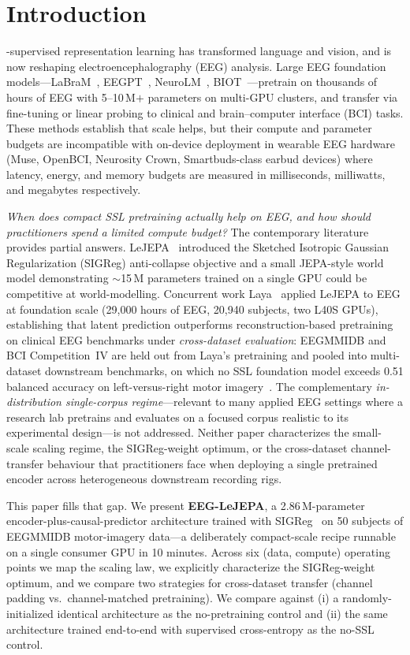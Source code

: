 \section{Introduction}
\label{sec:intro}

-supervised representation learning has transformed
language and vision, and is now reshaping electroencephalography (EEG)
analysis. Large EEG foundation models---LaBraM~\cite{labram2024},
EEGPT~\cite{eegpt2024}, NeuroLM~\cite{neurolm2025},
BIOT~\cite{biot2023}---pretrain on thousands of hours of EEG with 5--10\,M$+$
parameters on multi-GPU clusters, and transfer via fine-tuning or linear
probing to clinical and brain--computer interface (BCI) tasks. These
methods establish that scale helps, but their compute and parameter budgets
are incompatible with on-device deployment in wearable EEG hardware (Muse,
OpenBCI, Neurosity Crown, Smartbuds-class earbud devices) where latency,
energy, and memory budgets are measured in milliseconds, milliwatts, and
megabytes respectively.

\emph{When does compact SSL pretraining actually help on EEG, and how should
practitioners spend a limited compute budget?} The contemporary literature
provides partial answers. LeJEPA~\cite{lejepa2025} introduced the Sketched
Isotropic Gaussian Regularization (SIGReg) anti-collapse objective and a
small JEPA-style world model demonstrating $\sim$15\,M parameters trained on
a single GPU could be competitive at world-modelling. Concurrent work
Laya~\cite{laya2026} applied LeJEPA to EEG at foundation scale (29{,}000
hours of EEG, 20{,}940 subjects, two L40S GPUs), establishing that latent
prediction outperforms reconstruction-based pretraining on clinical EEG
benchmarks under \emph{cross-dataset evaluation}: EEGMMIDB and BCI Competition~IV
are held out from Laya's pretraining and pooled into multi-dataset downstream
benchmarks, on which no SSL foundation model exceeds 0.51 balanced accuracy
on left-versus-right motor imagery~\cite[Tab.~1]{laya2026}. The complementary
\emph{in-distribution single-corpus regime}---relevant to many applied EEG
settings where a research lab pretrains and evaluates on a focused corpus
realistic to its experimental design---is not addressed. Neither paper
characterizes the small-scale scaling regime, the SIGReg-weight optimum, or
the cross-dataset channel-transfer behaviour that practitioners face when
deploying a single pretrained encoder across heterogeneous downstream
recording rigs.

This paper fills that gap. We present \textbf{EEG-LeJEPA}, a 2.86\,M-parameter
encoder-plus-causal-predictor architecture trained with
SIGReg~\cite{lejepa2025} on 50 subjects of EEGMMIDB motor-imagery data---a
deliberately compact-scale recipe runnable on a single consumer GPU in 10
minutes. Across six (data, compute) operating points we map the scaling law,
we explicitly characterize the SIGReg-weight optimum, and we compare two
strategies for cross-dataset transfer (channel padding vs.\ channel-matched
pretraining). We compare against (i) a randomly-initialized identical
architecture as the no-pretraining control and (ii) the same architecture
trained end-to-end with supervised cross-entropy as the no-SSL control.

